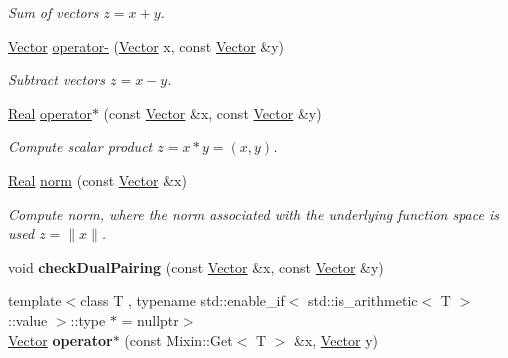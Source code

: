 \begin{DoxyCompactItemize}
\begin{DoxyCompactList}\small\item\em \-Sum of vectors $z=x+y$. \end{DoxyCompactList}\item 
\hypertarget{namespaceSpacy_a9eaf4be1a4e8f3ee03e4c4fdafa5687d}{\hyperlink{classSpacy_1_1Vector}{\-Vector} \hyperlink{namespaceSpacy_a9eaf4be1a4e8f3ee03e4c4fdafa5687d}{operator-\/} (\hyperlink{classSpacy_1_1Vector}{\-Vector} x, const \hyperlink{classSpacy_1_1Vector}{\-Vector} \&y)}\label{namespaceSpacy_a9eaf4be1a4e8f3ee03e4c4fdafa5687d}

\begin{DoxyCompactList}\small\item\em \-Subtract vectors $z=x-y$. \end{DoxyCompactList}\item 
\hypertarget{namespaceSpacy_a1d84603fc2bfbefca6a020b1217519ad}{\hyperlink{classSpacy_1_1Real}{\-Real} \hyperlink{namespaceSpacy_a1d84603fc2bfbefca6a020b1217519ad}{operator$\ast$} (const \hyperlink{classSpacy_1_1Vector}{\-Vector} \&x, const \hyperlink{classSpacy_1_1Vector}{\-Vector} \&y)}\label{namespaceSpacy_a1d84603fc2bfbefca6a020b1217519ad}

\begin{DoxyCompactList}\small\item\em \-Compute scalar product $z=x*y=(x,y)$. \end{DoxyCompactList}\item 
\hypertarget{namespaceSpacy_a86a4fc266aa19a07b0af16388907354b}{\hyperlink{classSpacy_1_1Real}{\-Real} \hyperlink{namespaceSpacy_a86a4fc266aa19a07b0af16388907354b}{norm} (const \hyperlink{classSpacy_1_1Vector}{\-Vector} \&x)}\label{namespaceSpacy_a86a4fc266aa19a07b0af16388907354b}

\begin{DoxyCompactList}\small\item\em \-Compute norm, where the norm associated with the underlying function space is used $ z = \|x\| $. \end{DoxyCompactList}\item 
\hypertarget{namespaceSpacy_ac354f06d21282619482e3ef4a841cd76}{void {\bfseries check\-Dual\-Pairing} (const \hyperlink{classSpacy_1_1Vector}{\-Vector} \&x, const \hyperlink{classSpacy_1_1Vector}{\-Vector} \&y)}\label{namespaceSpacy_ac354f06d21282619482e3ef4a841cd76}

\item 
\hypertarget{namespaceSpacy_a0e5e7a61e6d2996df2b3e86371d38dfa}{{\footnotesize template$<$class T , typename std\-::enable\-\_\-if$<$ std\-::is\-\_\-arithmetic$<$ T $>$\-::value $>$\-::type $\ast$  = nullptr$>$ }\\\hyperlink{classSpacy_1_1Vector}{\-Vector} {\bfseries operator$\ast$} (const \-Mixin\-::\-Get$<$ \-T $>$ \&x, \hyperlink{classSpacy_1_1Vector}{\-Vector} y)}\label{namespaceSpacy_a0e5e7a61e6d2996df2b3e86371d38dfa}


\end{DoxyCompactItemize}
